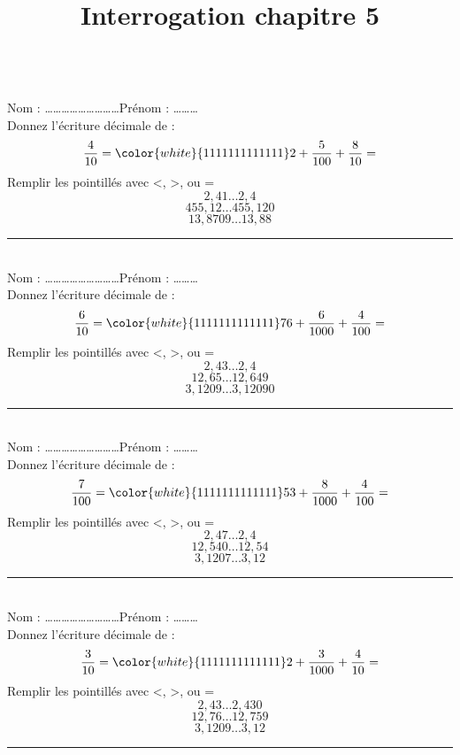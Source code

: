 \documentclass[14 pt]{extarticle}
\title{Interrogation chapitre 5}
\date{}
\theoremstyle{plain}
\begin{document}
 \ \\  
 Nom : \ldots\ldots\ldots\ldots\ldots\ldots\ldots\ldots\ldots Prénom : \ldots\ldots\ldots \\ 
Donnez l'écriture décimale de :
 \[ \frac4{10} ={\color{white}{1111111111111}} 2 + \frac5{100} + \frac8{10} = \]
 Remplir les pointillés avec <, >, ou = 
 \[ 2, 41 \ldots 2,4 \]
 \[ 455,12\ldots 455,120 \]
 \[ 13,8709 \ldots 13,88 \]
 \hrule
 \ \\  
Nom : \ldots\ldots\ldots\ldots\ldots\ldots\ldots\ldots\ldots Prénom : \ldots\ldots\ldots \\ 
Donnez l'écriture décimale de : 
 \[ \frac6{10} ={\color{white}{1111111111111}} 76 + \frac6{1000} + \frac4{100} = \]
 Remplir les pointillés avec <, >, ou = 
 \[ 2, 43 \ldots 2,4 \]
 \[ 12, 65 \ldots 12,649 \]
 \[ 3,1209 \ldots 3,12090 \]
 
 \hrule
 \ \\  
Nom : \ldots\ldots\ldots\ldots\ldots\ldots\ldots\ldots\ldots Prénom : \ldots\ldots\ldots \\ 
Donnez l'écriture décimale de : 
 \[ \frac7{100} ={\color{white}{1111111111111}} 53 + \frac8{1000} + \frac4{100} = \]
 Remplir les pointillés avec <, >, ou = 
 \[ 2, 47 \ldots 2,4 \]
 \[ 12, 540 \ldots 12,54 \]
 \[ 3,1207 \ldots 3,12 \]
 
 \hrule
 \ \\ 
 
Nom : \ldots\ldots\ldots\ldots\ldots\ldots\ldots\ldots\ldots Prénom : \ldots\ldots\ldots \\ 
Donnez l'écriture décimale de : 
 \[ \frac3{10} ={\color{white}{1111111111111}} 2 + \frac3{1000} + \frac4{10} = \]
 Remplir les pointillés avec <, >, ou = 
 \[ 2, 43 \ldots 2,430 \]
 \[ 12, 76 \ldots 12,759 \]
 \[ 3,1209 \ldots 3,12 \]
 
 \hrule
 
 
 
 	
\end{document}
